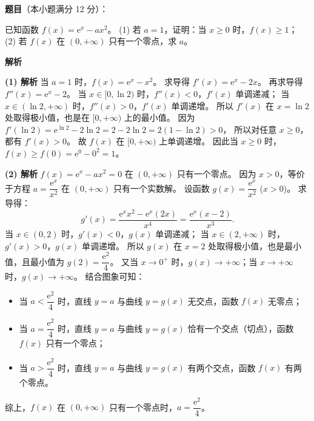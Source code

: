 \begin{answer}

\textbf{题目}（本小题满分 12 分）：

已知函数 $f(x)=\mathrm e^x-ax^2$。
(1) 若 $a=1$，证明：当 $x\geqslant 0$ 时，$f(x)\geqslant 1$；
(2) 若 $f(x)$ 在 $(0,+\infty)$ 只有一个零点，求 $a$。

\textbf{解析}

\textbf{(1) 解析} 当 $a=1$ 时，$f(x) = \mathrm e^x - x^2$。
求导得 $f'(x) = \mathrm e^x - 2x$。
再求导得 $f''(x) = \mathrm e^x - 2$。
当 $x\in[0, \ln 2)$ 时，$f''(x)<0$，$f'(x)$ 单调递减；
当 $x\in(\ln 2, +\infty)$ 时，$f''(x)>0$，$f'(x)$ 单调递增。
所以 $f'(x)$ 在 $x=\ln 2$ 处取得极小值，也是在 $[0,+\infty)$ 上的最小值。
因为 $f'(\ln 2) = \mathrm e^{\ln 2} - 2\ln 2 = 2 - 2\ln 2 = 2(1-\ln 2) > 0$，
所以对任意 $x\geqslant 0$，都有 $f'(x) > 0$。
故 $f(x)$ 在 $[0,+\infty)$ 上单调递增。
因此当 $x\geqslant 0$ 时，$f(x) \geqslant f(0) = \mathrm e^0 - 0^2 = 1$。

\textbf{(2) 解析} $f(x) = \mathrm e^x - ax^2 = 0$ 在 $(0,+\infty)$ 只有一个零点。
因为 $x>0$，等价于方程 $a = \dfrac{\mathrm e^x}{x^2}$ 在 $(0,+\infty)$ 只有一个实数解。
设函数 $g(x) = \dfrac{\mathrm e^x}{x^2}$ ($x>0$)。
求导得：
\nopagebreak[4]
\[g'(x) = \dfrac{\mathrm e^x x^2 - \mathrm e^x(2x)}{x^4} = \dfrac{\mathrm e^x(x-2)}{x^3}.\]
当 $x\in(0,2)$ 时，$g'(x)<0$，$g(x)$ 单调递减；
当 $x\in(2,+\infty)$ 时，$g'(x)>0$，$g(x)$ 单调递增。
所以 $g(x)$ 在 $x=2$ 处取得极小值，也是最小值，且最小值为 $g(2) = \dfrac{\mathrm e^2}{4}$。
又当 $x\to 0^+$ 时，$g(x)\to +\infty$；当 $x\to +\infty$ 时，$g(x)\to +\infty$。
结合图象可知：
\begin{itemize}
\item 当 $a < \dfrac{\mathrm e^2}{4}$ 时，直线 $y=a$ 与曲线 $y=g(x)$ 无交点，函数 $f(x)$ 无零点；
\item 当 $a = \dfrac{\mathrm e^2}{4}$ 时，直线 $y=a$ 与曲线 $y=g(x)$ 恰有一个交点（切点），函数 $f(x)$ 只有一个零点；
\item 当 $a > \dfrac{\mathrm e^2}{4}$ 时，直线 $y=a$ 与曲线 $y=g(x)$ 有两个交点，函数 $f(x)$ 有两个零点。
\end{itemize}
综上，$f(x)$ 在 $(0,+\infty)$ 只有一个零点时，$a = \dfrac{\mathrm e^2}{4}$。



\par\medskip

\end{answer}
